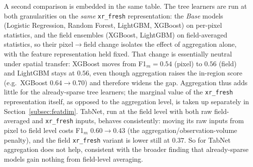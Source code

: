 \documentclass[pdflatex,sn-mathphys]{sn-jnl} %
\begin{document}
A second comparison is embedded in the same table. The tree learners are run at both
granularities on the \emph{same} \texttt{xr\_fresh} representation: the \emph{Base}
models (Logistic Regression, Random Forest, LightGBM, XGBoost) on per-pixel statistics,
and the field ensembles (XGBoost, LightGBM) on field-averaged statistics, so their
pixel$\rightarrow$field change isolates the effect of aggregation alone, with the
feature representation held fixed. That change is essentially neutral under spatial
transfer: XGBoost moves from F1$_m=0.54$ (pixel) to $0.56$ (field) and LightGBM stays at
$0.56$, even though aggregation raises the in-region score (e.g.\ XGBoost
$0.64\rightarrow0.70$) and therefore widens the gap. Aggregation thus adds little for
the already-sparse tree learners; the marginal value of the \texttt{xr\_fresh}
representation itself, as opposed to the aggregation level, is taken up separately in
Section~\ref{subsec:featdim}.
TabNet, run at the field level with both raw field-averaged and
\texttt{xr\_fresh} inputs, behaves consistently: moving its raw inputs from pixel to field
level costs F1$_m$ $0.60\rightarrow0.43$ (the aggregation/observation-volume penalty), and the
field \texttt{xr\_fresh} variant is lower still at $0.37$. So for TabNet aggregation does
not help, consistent with the broader finding that already-sparse models gain nothing
from field-level averaging.
\end{document}
